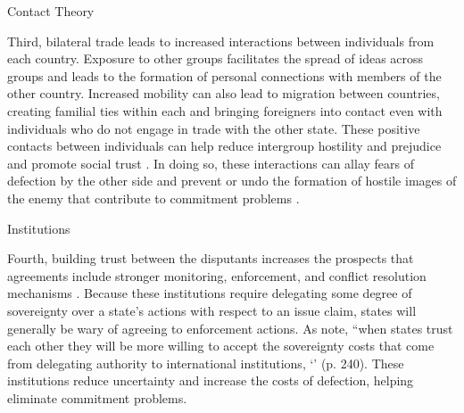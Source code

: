 	
	Contact Theory
	
	Third, bilateral trade leads to increased interactions between individuals from each country. Exposure to other groups facilitates the spread of ideas across groups and leads to the formation of personal connections with members of the other country. Increased mobility can also lead to migration between countries, creating familial ties within each and bringing foreigners into contact even with individuals who do not engage in trade with the other state. These positive contacts between individuals can help reduce intergroup hostility and prejudice and promote social trust \citep{pettigrew2008}. In doing so, these interactions can allay fears of defection by the other side and prevent or undo the formation of hostile images of the enemy that contribute to commitment problems \citep{vasquez2009}. %
	
	Institutions
	
	Fourth, building trust between the disputants increases the prospects that agreements include stronger monitoring, enforcement, and conflict resolution mechanisms \citep{elhance2000, espey2004, stinnett2009, tir2011, verghese1993}. Because these institutions require delegating some degree of sovereignty over a state’s actions with respect to an issue claim, states will generally be wary of agreeing to enforcement actions. As \citet{stinnett2009} note, ``when states trust each other they will be more willing to accept the sovereignty costs that come from delegating authority to international institutions, ‘’ (p. 240). These institutions reduce uncertainty and increase the costs of defection, helping eliminate commitment problems. 
	
